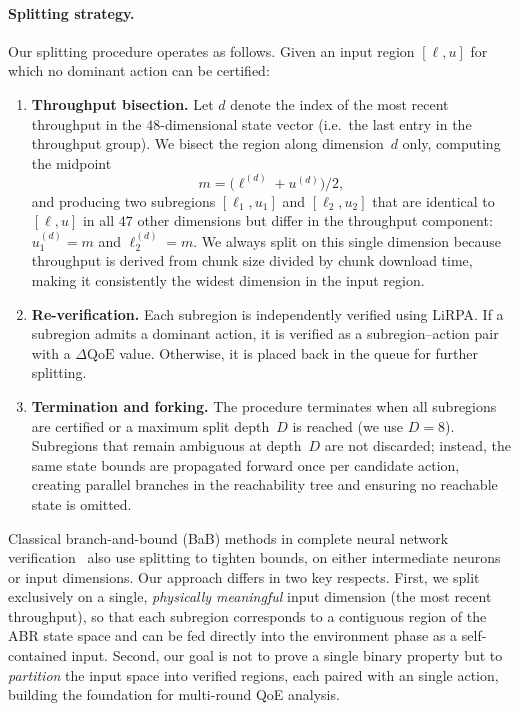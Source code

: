 \documentclass[thesis]{uofithesis} %
\begin{document}
    \paragraph{Splitting strategy.}
    Our splitting procedure operates as follows.  Given an input region
    $[\ell, u]$ for which no dominant action can be certified:
    \begin{enumerate}
        \item \textbf{Throughput bisection.}  Let $d$ denote the index
            of the most recent throughput in the $48$-dimensional state
            vector (i.e.\ the last entry in the throughput group).  We
            bisect the region along dimension~$d$ only, computing the
            midpoint
            \begin{equation}
                m = \bigl(\ell^{(d)} + u^{(d)}\bigr) / 2,
                \label{eq:split-dim}
            \end{equation}
            and producing two subregions $[\ell_1, u_1]$ and
            $[\ell_2, u_2]$ that are identical to $[\ell, u]$ in all
            $47$ other dimensions but differ in the throughput
            component: $u_1^{(d)} = m$ and $\ell_2^{(d)} = m$.
            We always split on this single dimension because throughput
            is derived from chunk size divided by chunk download time,
            making it consistently the widest dimension in the input
            region.
        \item \textbf{Re-verification.}  Each subregion is independently
            verified using LiRPA.  If a subregion admits a dominant
            action, it is verified as a subregion--action pair with a
            $\Delta\mathrm{QoE}$ value.  Otherwise, it is placed back in
            the queue for further splitting.
        \item \textbf{Termination and forking.}  The procedure terminates
            when all subregions are certified or a maximum split
            depth~$D$ is reached (we use $D = 8$).  Subregions that
            remain ambiguous at depth~$D$ are not discarded; instead,
            the same state bounds are propagated forward once per
            candidate action, creating parallel branches in the
            reachability tree and ensuring no reachable state is
            omitted.
    \end{enumerate}

    Classical branch-and-bound (BaB) methods in complete neural network
    verification~\cite{bab} also use splitting to tighten bounds,
    on either intermediate neurons or input dimensions.  Our approach
    differs in two key respects.  First, we split exclusively on a
    single, \emph{physically meaningful} input dimension (the most
    recent throughput), so that each subregion corresponds to a
    contiguous region of the ABR state space and can be fed directly
    into the environment phase as a self-contained input.  Second,
    our goal is not to prove a single binary property but to
    \emph{partition} the input space into verified regions, each
    paired with an single action, building the foundation for multi-round
    QoE analysis.
\end{document}
